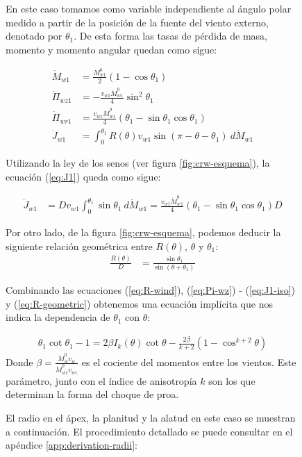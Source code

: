 \begin{figure}
En este caso tomamos como variable independiente al ángulo polar medido a partir de la posición de la fuente del viento externo, denotado por $\theta_1$. De esta forma las tasas de pérdida de masa, momento y momento angular quedan como sigue:

\begin{align}
  \dot{M}_{w1} &= \frac{M^0_{w1}}{2}\left(1 - \cos\theta_1\right)\\
  \dot{\Pi}_{wz1} &= -\frac{v_{w1}\dot{M}^0_{w1}}{4}\sin^2\theta_1\\
  \dot{\Pi}_{wr1} &= \frac{v_{w1}\dot{M}^0_{w1}}{4}\left(\theta_1 - \sin\theta_1\cos\theta_1\right)\\
  \dot{J}_{w1} &= \int^{\theta_1}_0 R(\theta)v_{w1}\sin(\pi-\theta-\theta_1)~d\dot{M}_{w1} \label{eq:J1}
\end{align}

Utilizando la ley de los senos (ver figura \ref{fig:crw-esquema}), la ecuación (\ref{eq:J1}) queda como sigue:

\begin{align}
  \dot{J}_{w1} &= Dv_{w1}\int^{\theta_1}_0 \sin\theta_1~d\dot{M}_{w1} =
                 \frac{v_{w1}\dot{M}^0_{w1}}{4}\left(\theta_1 - \sin\theta_1\cos\theta_1\right) D \label{eq:J1-iso}
\end{align}

Por otro lado, de la figura \ref{fig:crw-esquema}, podemos deducir la siguiente relación geométrica entre $R(\theta)$,
$\theta$ y $\theta_1$:
\begin{align}
  \frac{R(\theta)}{D} &= \frac{\sin\theta_1}{\sin(\theta+\theta_1)} \label{eq:R-geometric}
\end{align}

Combinando las ecuaciones (\ref{eq:R-wind}), (\ref{eq:Pi-wz}) - (\ref{eq:J1-iso}) y (\ref{eq:R-geometric}) obtenemos una ecuación
implícita que nos indica la dependencia de $\theta_1$ con $\theta$:

\begin{align}
  \theta_1\cot\theta_1 -1 = 2\beta I_k(\theta)\cot\theta - \frac{2\beta}{k+2}\left(1 - \cos^{k+2}\theta\right) \label{eq:th1-th} 
\end{align}
Donde $\beta = \frac{\dot{M}^0_w v_w}{\dot{M}^0_{w1}v_{w1}}$ es el cociente del momentos entre los vientos. Este parámetro, junto con el índice de anisotropía $k$ son los que determinan la forma del choque de proa. 

El radio en el ápex, la planitud y la alatud en este caso se muestran a continuación. El procedimiento detallado se puede consultar en el apéndice \ref{app:derivation-radii}:


\end{figure}
